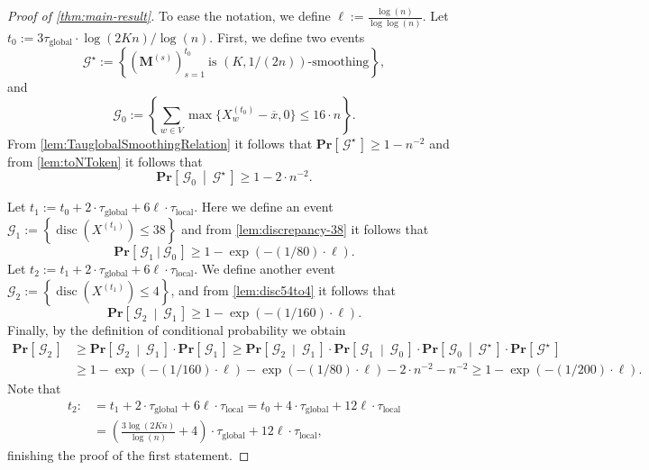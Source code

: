 \documentclass[twoside,leqno]{article}
\newcommand{\Pro}[1]{\mathbf{Pr} \left[\,#1\,\right]}
\newcommand{\Proco}[2]{\mathbf{Pr} \left[\,#1~\middle\vert~#2\,\right]}
\newcommand{\M}{\mathbf{M}}
\DeclareMathOperator{\discr}{\mathrm{disc}}
\DeclareMathOperator{\1}{\mathbf{1}}
\newcommand{\taulocal}{\tau_{\mathrm{local}}}
\newcommand{\tauglobal}{\tau_{\mathrm{global}}}
\numberwithin{equation}{section}
\begin{document}
\begin{proof}[Proof of \cref{thm:main-result}]
To ease the notation, we define $\ell:=\frac{\log(n)}{\log\log(n)}$.
Let $t_0:=3\tauglobal \cdot \log(2Kn)/\log(n)$. First, we define two events 
\[
\mathcal{G}^{\star}:=\left\{ \left(\M^{(s)}\right)_{s=1}^{t_0} ~\mbox{is $(K,1/(2n))$-smoothing}\right\},
\]
and
\[ \mathcal{G}_0 := \left\{ \sum_{w \in V} \max\{ X_w^{(t_0)} - \overline{x}, 0\} \leq 16 \cdot n \right\}.
\]
From \cref{lem:TauglobalSmoothingRelation} it follows that $\Pro{\mathcal{G}^{\star}}\ge 1-n^{-2}$ and from \cref{lem:toNToken} it follows that 
\[\Proco{\mathcal{G}_0 }{\mathcal{G}^{\star}} \geq 1-2\cdot n^{-2}.\] 

Let $t_1:=t_0+2 \cdot\tauglobal + {6 \ell} \cdot \taulocal$.
Here we define an event
$
\mathcal{G}_1:= \left\{\discr(X^{(t_1)}) \leq 38\right\}$
and from \cref{lem:discrepancy-38} it follows that \[\Pro{\mathcal{G}_1 ~\Big|~ \mathcal{G}_0 }\ge 1-\exp(- (1/80) \cdot \ell).\]
Let $t_2:=t_1+ 2\cdot \tauglobal+{6 \ell} \cdot \taulocal$. We define another event 
$
\mathcal{G}_2:= \left\{\discr(X^{(t_1)}) \leq 4\right\}$, and
from \cref{lem:disc54to4} it follows that
\[
\Proco{\mathcal{G}_2}{\mathcal{G}_1} \ge 1-\exp(-(1/160)\cdot \ell).\]
Finally, by the definition of conditional probability we obtain
\begin{align*}
\Pro{\mathcal{G}_2}& \geq \Proco{\mathcal{G}_2}{\mathcal{G}_1}\cdot \Pro{\mathcal{G}_1}\ge \Proco{\mathcal{G}_2}{\mathcal{G}_1}\cdot \Proco{\mathcal{G}_1}{\mathcal{G}_0}\cdot \Proco{\mathcal{G}_0}{\mathcal{G}^{\star}}\cdot \Pro{\mathcal{G}^{\star}} \\& \geq 1-\exp(-(1/160)\cdot \ell) - \exp(-(1/80)\cdot \ell) - 2\cdot n^{-2} -n^{-2} \ge 1-\exp(-(1/200)\cdot \ell).
\end{align*}
Note that 
\begin{align*}
    t_2: &= t_1+ 2\cdot \tauglobal+{6 \ell} \cdot \taulocal = t_0+4 \cdot\tauglobal + {12 \ell} \cdot \taulocal
    \\&= \left(\frac{3\log(2Kn)}{\log(n)}+4\right)\cdot \tauglobal + {12 \ell} \cdot \taulocal,
\end{align*}
finishing the proof of the first statement. 


\end{proof}
\end{document}
